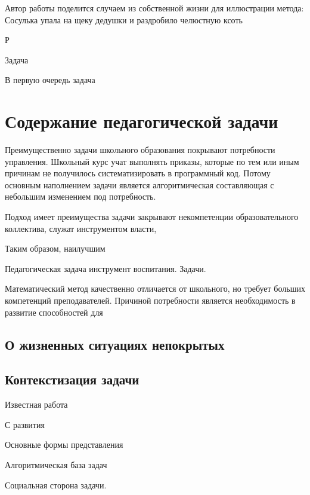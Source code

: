 Автор работы поделится случаем из собственной жизни для иллюстрации метода:
Сосулька упала на щеку дедушки и раздробило челюстную ксоть

Р


Задача 

В первую очередь задача



\section{Содержание педагогической задачи}



Преимущественно задачи школьного образования покрывают потребности управления. Школьный курс учат выполнять приказы, которые по тем или иным причинам не получилось систематизировать в программный код. Потому основным наполнением задачи является алгоритмическая составляющая с небольшим изменением под потребность. 

Подход имеет преимущества задачи закрывают некомпетенции образовательного коллектива, служат инструментом власти, 

Таким образом, наилучшим

Педагогическая задача инструмент воспитания. Задачи. 


Математический метод качественно отличается от школьного, но требует больших компетенций преподавателей.
Причиной потребности является необходимость в развитие способностей для 





\subsection{О жизненных ситуациях непокрытых}


\subsection{Контекстизация задачи}
Известная работа  

С развития 

Основные формы представления

Алгоритмическая база задач


Социальная сторона задачи. 